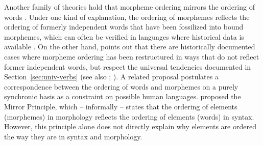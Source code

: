 \documentclass[man]{apa7}
\newcommand{\citep}{\parencite}
\newcommand{\citet}{\Textcite}
\newcommand\mhahn[1]{{\color{red}(#1)}}
\begin{document}












Another family of theories hold that morpheme ordering mirrors the ordering of words \citep{givon1971historical,venneman1973explanation,baker1985the}.
Under one kind of explanation, the ordering of morphemes reflects the ordering of formerly independent words that have been fossilized into bound morphemes, which can often be verified in languages where historical data is available \citep{givon1971historical,venneman1973explanation}.
On the other hand, \citet{bybee-morphology-1985} points out that there are historically documented cases where morpheme ordering has been restructured in ways that do not reflect former independent words, but respect the universal tendencies documented in Section~\ref{sec:univ-verbs} (see also \citet{mithun2000the, haspelmath1993the, mithun1995affixation}; \citet[Section 15]{rice2000morpheme}).
A related proposal postulates a correspondence between the ordering of words and morphemes on a purely synchronic basis as a constraint on possible human languages.
\citet{baker1985the} proposed the Mirror Principle, which -- informally -- states that the ordering of elements (morphemes) in morphology reflects the ordering of elements (words) in syntax.
However, this principle alone does not directly explain why elements are ordered the way they are in syntax and morphology.
\end{document}
